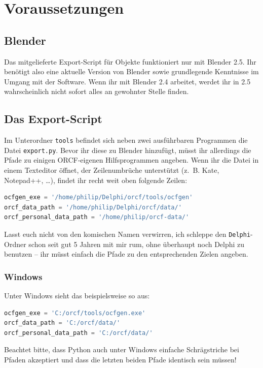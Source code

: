 \documentclass[a4paper]{article}
\newcommand{\cfile}[1]{\texttt{#1}}
\begin{document}
\section{Voraussetzungen}

\subsection{Blender}
Das mitgelieferte Export-Script für Objekte funktioniert nur mit Blender 2.5. Ihr benötigt also eine aktuelle Version von Blender sowie grundlegende
Kenntnisse im Umgang mit der Software. Wenn ihr mit Blender 2.4 arbeitet, werdet ihr in 2.5 wahrscheinlich nicht sofort alles an gewohnter Stelle
finden.

\subsection{Das Export-Script}
Im Unterordner \cfile{tools} befindet sich neben zwei ausführbaren Programmen die Datei \cfile{export.py}. Bevor ihr diese zu Blender hinzufügt,
müsst ihr allerdings die Pfade zu einigen ORCF-eigenen Hilfsprogrammen angeben. Wenn ihr die Datei in einem Texteditor öffnet, der Zeilenumbrüche
unterstützt (z.\, B. Kate, Notepad++, \dots ), findet ihr recht weit oben folgende Zeilen:
\begin{lstlisting}[language=python]
ocfgen_exe = '/home/philip/Delphi/orcf/tools/ocfgen'
orcf_data_path = '/home/philip/Delphi/orcf/data/'
orcf_personal_data_path = '/home/philip/orcf-data/'
\end{lstlisting}
Lasst euch nicht von den komischen Namen verwirren, ich schleppe den \cfile{Delphi}-Ordner schon seit gut 5 Jahren mit mir rum, ohne überhaupt noch
Delphi zu benutzen -- ihr müsst einfach die Pfade zu den entsprechenden Zielen angeben.

\subsubsection{Windows}
Unter Windows sieht das beispielsweise so aus:
\begin{lstlisting}[language=python]
ocfgen_exe = 'C:/orcf/tools/ocfgen.exe'
orcf_data_path = 'C:/orcf/data/'
orcf_personal_data_path = 'C:/orcf/data/'
\end{lstlisting}

Beachtet bitte, dass Python auch unter Windows einfache Schrägstriche bei Pfaden akzeptiert und dass die letzten beiden Pfade identisch sein müssen!
\end{document}
